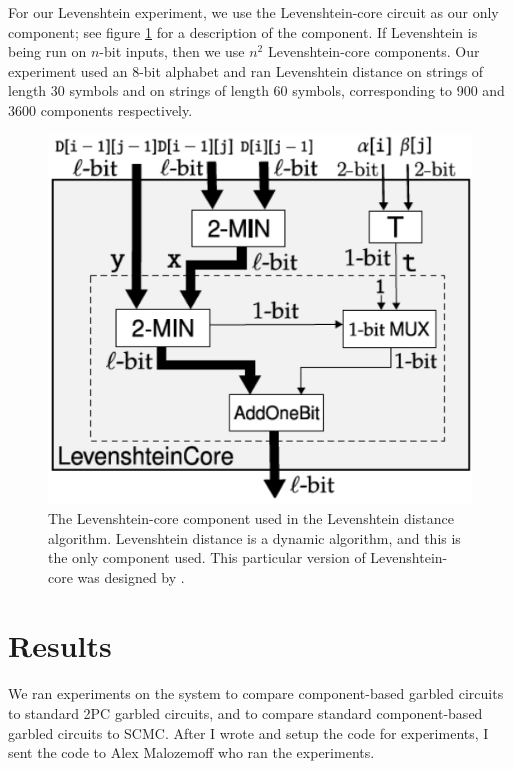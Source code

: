For our Levenshtein experiment, we use the Levenshtein-core circuit as our only component; see figure \ref{fig:leven-core} for a description of the component.
If Levenshtein is being run on $n$-bit inputs, then we use $n^2$ Levenshtein-core components. 
Our experiment used an 8-bit alphabet and ran Levenshtein distance on strings of length 30 symbols and on strings of length 60 symbols, corresponding to 900 and 3600 components respectively. 

\begin{figure}
    \center
    \includegraphics[scale=0.3]{images/leven_core}
    \caption[Levenshtein-core component]{The Levenshtein-core component used in the Levenshtein distance algorithm. 
    Levenshtein distance is a dynamic algorithm, and this is the only component used. 
    This particular version of Levenshtein-core was designed by \cite{faster2pc}.}
    \label{fig:leven-core}
\end{figure}

\section{Results}

We ran experiments on the \CompGC system to compare component-based garbled circuits to standard 2PC garbled circuits, and to compare standard component-based garbled circuits to SCMC.
After I wrote \CompGC and setup the code for experiments, I sent the code to Alex Malozemoff who ran the experiments.

